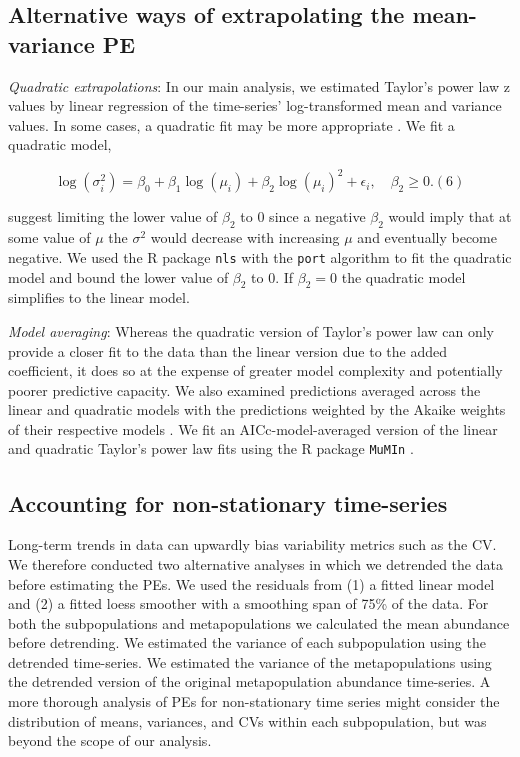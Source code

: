 \subsection{Alternative ways of extrapolating the mean-variance PE}

\textit{Quadratic extrapolations}: In our main analysis, we estimated Taylor's
power law z values by linear regression of the time-series' log-transformed mean
and variance values. In some cases, a quadratic fit may be more appropriate
\citep{routledge1991, perry1992}. We fit a quadratic model,

\begin{equation}
  \log(\sigma^2_i) = \beta_0 + \beta_1 \log(\mu_i) + \beta_2 \log(\mu_i)^2 +
  \epsilon_i, \quad \beta_2 \ge 0. (6)
  \label{eq:quad-taylor}
\end{equation}

\noindent
\citet{perry1992} suggest limiting the lower value of $\beta_2$ to 0 since
a negative $\beta_2$ would imply that at some value of $\mu$ the $\sigma^2$
would decrease with increasing $\mu$ and eventually become negative. We used
the R package \texttt{nls} \citep{r2013} with the \texttt{port} algorithm
to fit the quadratic model and bound the lower value of $\beta_2$ to 0. If
$\beta_2 = 0$ the quadratic model simplifies to the linear model.

\textit{Model averaging}: Whereas the quadratic version of Taylor's power law
can only provide a closer fit to the data than the linear version due to the
added coefficient, it does so at the expense of greater model complexity and
potentially poorer predictive capacity. We also examined predictions averaged
across the linear and quadratic models with the predictions weighted by the
Akaike weights of their respective models \citep{burnham2002}. We fit an
AICc-model-averaged version of the linear and quadratic Taylor's power law fits
using the R package \texttt{MuMIn} \citep{barton2012}.

\subsection{Accounting for non-stationary time-series}

Long-term trends in data can upwardly bias variability metrics such as the CV.
We therefore conducted two alternative analyses in which we detrended
the data before estimating the PEs. We used the residuals from (1) a fitted
linear model and (2) a fitted loess smoother \citep[\texttt{loess}
function;][]{r2013} with a smoothing span of 75\% of the data. For both
the subpopulations and metapopulations we calculated the mean abundance before
detrending. We estimated the variance of each subpopulation using the detrended
time-series. We estimated the variance of the metapopulations using the
detrended version of the original metapopulation abundance time-series.
A more thorough analysis of PEs for non-stationary time series might
consider the distribution of means, variances, and CVs within each
subpopulation, but was beyond the scope of our analysis.

